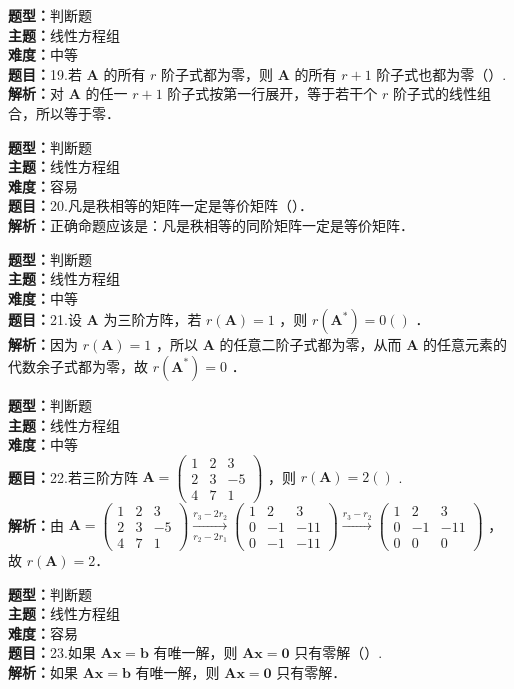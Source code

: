 \documentclass{ctexart}
\newenvironment{question}[5]{%
	\noindent\textbf{题型：}#1\\
	\textbf{主题：}#2\\
	\textbf{难度：}#3\\
	\textbf{题目：}#4\\
	\textbf{解析：}#5\\
	\vspace{1em}
}{}
\begin{document}
	\begin{question}
		{判断题}
		{线性方程组}
		{中等}
		{19.若 \(\mathbf{A}\) 的所有 \(r\) 阶子式都为零，则 \(\mathbf{A}\) 的所有 \(r+1\) 阶子式也都为零（）. }
		{对 \(\mathbf{A}\) 的任一 \(r+1\) 阶子式按第一行展开，等于若干个 \(r\) 阶子式的线性组合，所以等于零．}
	\end{question}
	
	\begin{question}
		{判断题}
		{线性方程组}
		{容易}
		{20.凡是秩相等的矩阵一定是等价矩阵（）．}
		{正确命题应该是：凡是秩相等的同阶矩阵一定是等价矩阵．}
	\end{question}
	
	\begin{question}
		{判断题}
		{线性方程组}
		{中等}
		{21.设 \(\mathbf{A}\) 为三阶方阵，若 \(r(\mathbf{A})=1\) ，则 \(r\left(\mathbf{A}^*\right)=0()\) ．}
		{因为 \(r(\mathbf{A})=1\) ，所以 \(\mathbf{A}\) 的任意二阶子式都为零，从而 \(\mathbf{A}\) 的任意元素的代数余子式都为零，故 \(r\left(\mathbf{A}^*\right)=0\) ．}
	\end{question}
	
	\begin{question}
		{判断题}
		{线性方程组}
		{中等}
		{22.若三阶方阵 \(\mathbf{A}=\left(\begin{array}{ccc}1 & 2 & 3 \\ 2 & 3 & -5 \\ 4 & 7 & 1\end{array}\right)\) ，则 \(r(\mathbf{A})=2()\) . }
		{由 \(\mathbf{A}=\left(\begin{array}{ccc}1 & 2 & 3 \\ 2 & 3 & -5 \\ 4 & 7 & 1\end{array}\right) \xrightarrow[r_2-2 r_1]{r_3-2 r_2}\left(\begin{array}{ccc}1 & 2 & 3 \\ 0 & -1 & -11 \\ 0 & -1 & -11\end{array}\right) \xrightarrow{r_3-r_2}\left(\begin{array}{ccc}1 & 2 & 3 \\ 0 & -1 & -11 \\ 0 & 0 & 0\end{array}\right)\) ，故 \(r(\mathbf{A})=2\)．}
	\end{question}
	
	\begin{question}
		{判断题}
		{线性方程组}
		{容易}
		{23.如果 \(\mathbf{Ax}=\mathbf{b}\) 有唯一解，则 \(\mathbf{Ax}=\mathbf{0}\) 只有零解（）. }
		{如果 \(\mathbf{Ax}=\mathbf{b}\) 有唯一解，则 \(\mathbf{Ax}=\mathbf{0}\) 只有零解．}
	\end{question}
	
\end{document}
